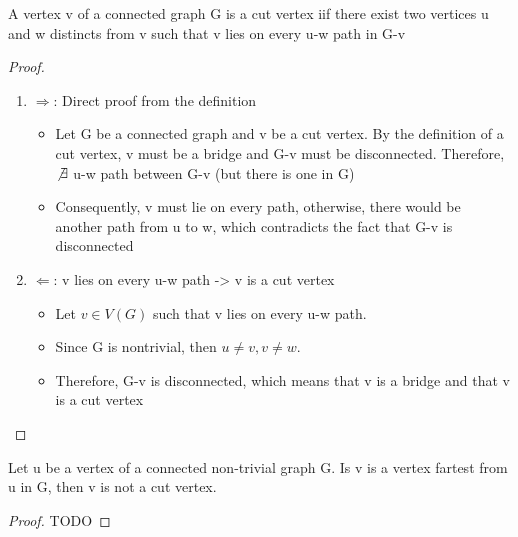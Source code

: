 \documentclass{article}
\begin{document}
\begin{theorem}
    A vertex v of a connected graph G is a cut vertex iif there exist two
    vertices u and w distincts from v such that v lies on every u-w path in
    G-v
\end{theorem}

\begin{proof}
    \begin{enumerate}
        \item $\Longrightarrow$: Direct proof from the definition
	    \begin{itemize}
	        \item Let G be a connected graph and v be a cut vertex. By the
		    definition of a cut vertex, v must be a bridge and G-v
		    must be disconnected. Therefore, $\not\exists$ u-w path
		    between G-v (but there is one in G)
		\item Consequently, v must lie on every path, otherwise, there
		    would be another path from u to w, which contradicts the
		    fact that G-v is disconnected
	    \end{itemize}
	\item $\Longleftarrow$: v lies on every u-w path -> v is a cut vertex
	    \begin{itemize}
		\item  Let $ v \in V(G)$ such that v lies on every u-w path.
		\item Since G is nontrivial, then $ u \neq v, v \neq w$.
		\item Therefore, G-v is disconnected, which means that v is
		    a bridge and that v is a cut vertex
	    \end{itemize}
    \end{enumerate}
\end{proof}

\begin{lemma}
\end{lemma}

\begin{theorem}
    Let u be a vertex of a connected non-trivial graph G. Is v is a vertex
    fartest from u in G, then v is not a cut vertex.
\end{theorem}

\begin{proof}
    TODO
\end{proof}
\end{document}

